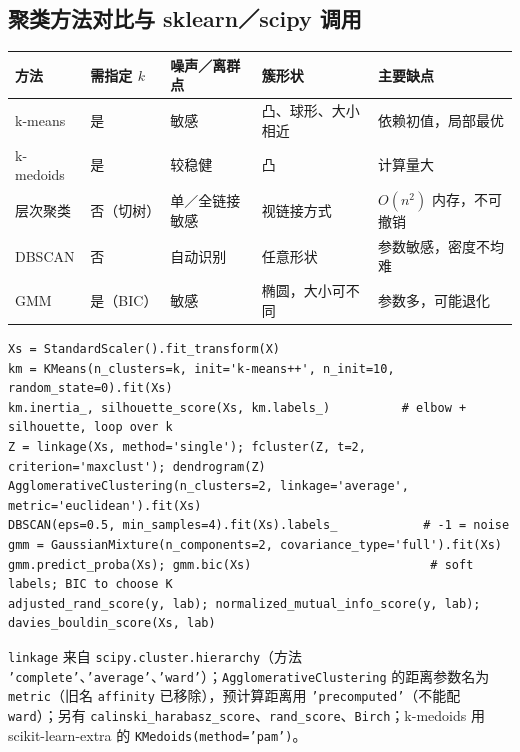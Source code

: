\subsection{聚类方法对比与 sklearn／scipy 调用}
\begin{center}\small
\begin{tabularx}{\linewidth}{@{}p{1.9cm}p{2.2cm}p{2.4cm}p{3.3cm}L@{}}
\toprule
方法 & 需指定 $k$ & 噪声／离群点 & 簇形状 & 主要缺点\\
\midrule
k-means & 是 & 敏感 & 凸、球形、大小相近 & 依赖初值，局部最优\\
k-medoids & 是 & 较稳健 & 凸 & 计算量大\\
层次聚类 & 否（切树）& 单／全链接敏感 & 视链接方式 & $O(n^2)$ 内存，不可撤销\\
DBSCAN & 否 & 自动识别 & 任意形状 & 参数敏感，密度不均难\\
GMM & 是（BIC）& 敏感 & 椭圆，大小可不同 & 参数多，可能退化\\
\bottomrule
\end{tabularx}
\end{center}
\begin{lstlisting}[basicstyle=\ttfamily\footnotesize]
Xs = StandardScaler().fit_transform(X)
km = KMeans(n_clusters=k, init='k-means++', n_init=10, random_state=0).fit(Xs)
km.inertia_, silhouette_score(Xs, km.labels_)          # elbow + silhouette, loop over k
Z = linkage(Xs, method='single'); fcluster(Z, t=2, criterion='maxclust'); dendrogram(Z)
AgglomerativeClustering(n_clusters=2, linkage='average', metric='euclidean').fit(Xs)
DBSCAN(eps=0.5, min_samples=4).fit(Xs).labels_            # -1 = noise
gmm = GaussianMixture(n_components=2, covariance_type='full').fit(Xs)
gmm.predict_proba(Xs); gmm.bic(Xs)                         # soft labels; BIC to choose K
adjusted_rand_score(y, lab); normalized_mutual_info_score(y, lab); davies_bouldin_score(Xs, lab)
\end{lstlisting}
\texttt{linkage} 来自 \texttt{scipy.cluster.hierarchy}（方法 \texttt{'complete'}、\texttt{'average'}、\texttt{'ward'}）；\texttt{AgglomerativeClustering} 的距离参数名为 \texttt{metric}（旧名 \texttt{affinity} 已移除），预计算距离用 \texttt{'precomputed'}（不能配 \texttt{ward}）；另有 \texttt{calinski\_\allowbreak harabasz\_\allowbreak score}、\texttt{rand\_score}、\texttt{Birch}；k-medoids 用 scikit-learn-extra 的 \texttt{KMedoids(method='pam')}。
